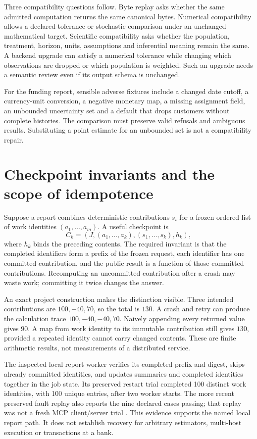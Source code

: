 Three compatibility questions follow. Byte replay asks whether the same
admitted computation returns the same canonical bytes. Numerical compatibility
allows a declared tolerance or stochastic comparison under an unchanged
mathematical target. Scientific compatibility asks whether the population,
treatment, horizon, units, assumptions and inferential meaning remain the
same. A backend upgrade can satisfy a numerical tolerance while changing
which observations are dropped or which population is weighted. Such an
upgrade needs a semantic review even if its output schema is unchanged.

For the funding report, sensible adverse fixtures include a changed date
cutoff, a currency-unit conversion, a negative monetary map, a missing
assignment field, an unbounded uncertainty set and a default that drops
customers without complete histories. The comparison must preserve valid
refusals and ambiguous results. Substituting a point estimate for an
unbounded set is not a compatibility repair.

\section{Checkpoint invariants and the scope of idempotence}

Suppose a report combines deterministic contributions $s_i$ for a frozen
ordered list of work identities $(a_1,\ldots,a_m)$. A useful checkpoint is
\[
 C_k=(J,(a_1,\ldots,a_k),(s_1,\ldots,s_k),h_k),
\]
where $h_k$ binds the preceding contents. The required invariant is that the
completed identifiers form a prefix of the frozen request, each identifier
has one committed contribution, and the public result is a function of those
committed contributions. Recomputing an uncommitted contribution after a
crash may waste work; committing it twice changes the answer.

An exact project construction makes the distinction visible. Three intended
contributions are $100,-40,70$, so the total is $130$. A crash and retry can
produce the calculation trace $100,-40,-40,70$. Naively appending every
returned value gives $90$. A map from work identity to its immutable
contribution still gives $130$, provided a repeated identity cannot carry
changed contents. These are finite arithmetic results, not measurements of
a distributed service\cite{exec13_ops_exact}.

The inspected local report worker verifies its completed prefix and digest,
skips already committed identities, and updates summaries and completed
identities together in the job state. Its preserved restart trial completed
100 distinct work identities, with 100 unique entries, after two worker
starts. The more recent preserved fault replay also reports the nine declared
cases passing; that replay was not a fresh MCP client/server trial
\cite{exec13_ops_source,exec13_ops_faults}. This evidence supports the named
local report path. It does not establish recovery for arbitrary estimators,
multi-host execution or transactions at a bank.

